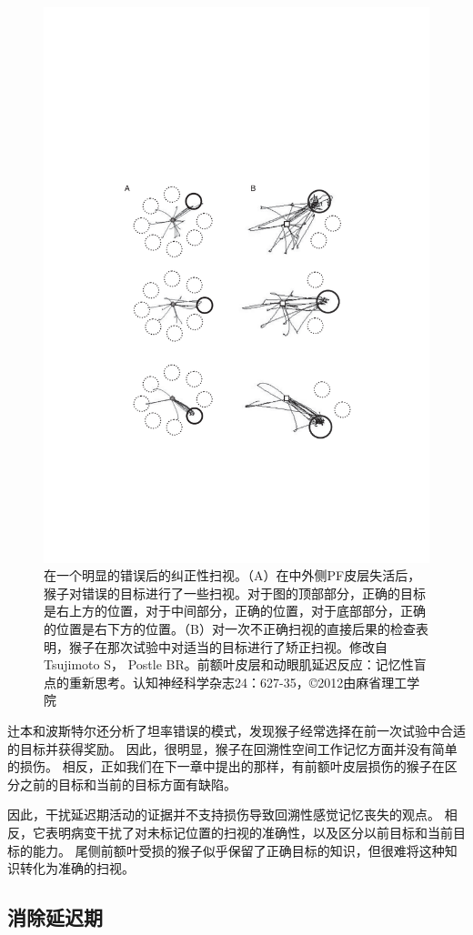 \begin{figure}
	\centering
	\includegraphics[width=0.7\linewidth]{image_pfc/Fig_5_8}
	\caption{在一个明显的错误后的纠正性扫视。（A）在中外侧PF皮层失活后，猴子对错误的目标进行了一些扫视。对于图的顶部部分，正确的目标是右上方的位置，对于中间部分，正确的位置，对于底部部分，正确的位置是右下方的位置。（B）对一次不正确扫视的直接后果的检查表明，猴子在那次试验中对适当的目标进行了矫正扫视。修改自Tsujimoto S， Postle BR。前额叶皮层和动眼肌延迟反应：记忆性盲点的重新思考。认知神经科学杂志24：627-35，©2012由麻省理工学院}
	\label{fig:fig_5_8}
\end{figure}


辻本和波斯特尔还分析了坦率错误的模式，发现猴子经常选择在前一次试验中合适的目标并获得奖励。
因此，很明显，猴子在回溯性空间工作记忆方面并没有简单的损伤。
相反，正如我们在下一章中提出的那样，有前额叶皮层损伤的猴子在区分之前的目标和当前的目标方面有缺陷。


因此，干扰延迟期活动的证据并不支持损伤导致回溯性感觉记忆丧失的观点。
相反，它表明病变干扰了对未标记位置的扫视的准确性，以及区分以前目标和当前目标的能力。
尾侧前额叶受损的猴子似乎保留了正确目标的知识，但很难将这种知识转化为准确的扫视。



\subsection{消除延迟期}

